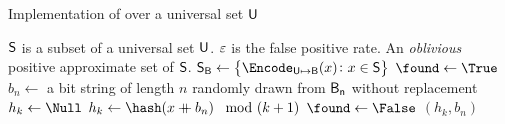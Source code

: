 \documentclass[ ../main.tex]{subfiles}
\begin{document}
\begin{algorithm}
    \caption{Implementation of \protect\MakeSingularHashSet over a universal 
    set $\Set{U}$}
    \label{alg:makeset}
    \DontPrintSemicolon
    \KwIn
    {
        $\Set{S}$ is a subset of a universal set $\Set{U}$.
        $\varepsilon$ is the false positive rate.
    }
    \KwOut
    {
        An \emph{oblivious} positive approximate set of $\Set{S}$.
    }
    {
        $\Set{S}_{\Set{B}} \gets \left\{\Encode_{\Set{U} \mapsto \Set{B}}(x) 
        \colon x \in \Set{S}\right\}$\;
        {
            {
                $\found \gets \True$\;
                $b_n \gets $ a bit string of length $n$ randomly drawn from 
                $\Set{B}[n]$ without replacement\;
                $h_k \gets \Null$\;
                {
                    {
                        $h_k \gets \hash\!\left(x \catop b_n\right) \mod 
                        (k+1)$\;
                    }
                    {
                        $\found \gets \False$\;
                    }
                }
                \If{\found}
                {
                    \Return $(h_k, b_n)$\;
                }
            }
        }
    }
\end{algorithm}
\end{document}
